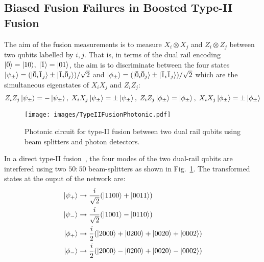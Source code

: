 \documentclass[reprint,
groupedaddress,
 prl,amsmath,amssymb,
 aps]{revtex4-2}
\theoremstyle{definition}
\begin{document}
\begin{bibunit}
\section{Biased Fusion Failures in Boosted Type-II Fusion}
The aim of the fusion measurements is to measure $X_i\otimes X_j$ and $Z_i\otimes  Z_j$ between two qubits labelled by $i,j$. That is, in terms of the dual rail encoding $\ket{\bar{0}}={ \ket{10}},\; \ket{\bar{1}}=  { \ket{01}}$, the aim is to discriminate between the four states $\ket{\psi_\pm}=(\ket{\bar{0}_i\bar{1}_j}\pm \ket{\bar{1}_i\bar{0}_j})/\sqrt{2}$ and $\ket{\phi_\pm}=(\ket{\bar{0}_i\bar{0}_j}\pm \ket{\bar{1}_i\bar{1}_j})/\sqrt{2}$ which are the simultaneous 
eigenstates of $X_i X_j$ and $Z_i Z_j$:
\begin{align}
Z_iZ_j\ket{\psi_\pm}=-\ket{\psi_\pm},\; X_iX_j\ket{\psi_\pm}=\pm\ket{\psi_\pm},\;
Z_iZ_j\ket{\phi_\pm}=\ket{\phi_\pm},\; X_iX_j\ket{\phi_\pm}=\pm\ket{\phi_\pm}
\end{align}
\begin{figure}[ht]
    \centering
\texttt{[image: images/TypeIIFusionPhotonic.pdf]}
    \caption{Photonic circuit for type-II fusion between two dual rail qubits using beam splitters and photon detectors.}
    \label{fig:type2photonic}
\end{figure}
In a direct type-II fusion~\cite{browne2005resource,gilchrist2007efficient}, the four modes of the two dual-rail qubits are interfered using two $50:50$ beam-splitters as shown in Fig.~\ref{fig:type2photonic}. The transformed states at the ouput of the network are:
\begin{equation}
\begin{aligned}
\ket{\psi_+}&\rightarrow \frac{i}{\sqrt{2}}(\ket{1100}+\ket{0011})\\
\ket{\psi_-}&\rightarrow \frac{i}{\sqrt{2}}(\ket{1001}-\ket{0110})\\
\ket{\phi_+}&\rightarrow \frac{i}{{2}}(\ket{2000}+\ket{0200}+\ket{0020}+\ket{0002})\\
\ket{\phi_-}&\rightarrow \frac{i}{{2}}(\ket{2000}-\ket{0200}+\ket{0020}-\ket{0002})
\end{aligned}
\end{equation}

\end{bibunit}
\end{document}
